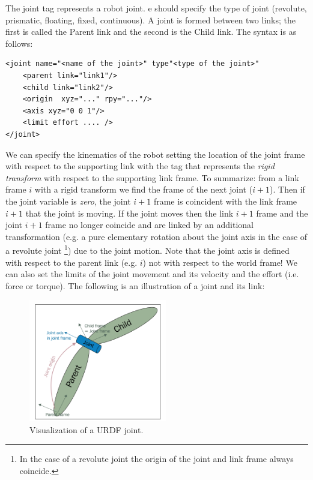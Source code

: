\documentclass[11pt]{article}
\begin{document}
The joint tag represents a robot joint. e should specify the type of joint (revolute, prismatic, floating, fixed, continuous).  
A  joint is formed between two links; the first is called the Parent link
and the second is the Child link. The syntax is as follows:

\begin{Verbatim}	
<joint name="<name of the joint>" type"<type of the joint>"
	<parent link="link1"/>
	<child link="link2"/>
	<origin  xyz="..." rpy="..."/>
	<axis xyz="0 0 1"/>
	<limit effort .... />
</joint>
\end{Verbatim}

We can specify the kinematics of the robot setting the location of the joint frame with respect to the supporting link with the tag  that represents the \textit{rigid transform} with respect to the supporting link frame. To summarize: from a link frame $i$ with a rigid transform we find the frame of the next joint ($i+1$). Then if the joint variable  is \textit{zero}, the joint $i+1$ frame is coincident with the link frame $i+1$ that the joint is moving. If the joint moves  then the link $i+1$ frame and the joint $i+1$ frame no longer coincide and are linked by an additional transformation (e.g. a pure elementary rotation about the joint axis in the  case of a revolute joint \footnote{In the case of a revolute joint the origin of the joint and link frame always coincide.}) due to the joint motion. Note that the joint axis is defined with respect to the parent link (e.g. $i$) not with respect to the world frame!
We can also set the limits of the joint movement and
its velocity and the effort (i.e. force or torque).
 The following is an illustration of a joint and
its link:

\begin{figure}[H]
	\centering
	\includegraphics[width=6cm]{pics/joint.png}
	\caption{Visualization of a URDF joint.}
	\label{fig:link}
\end{figure}
\end{document}
